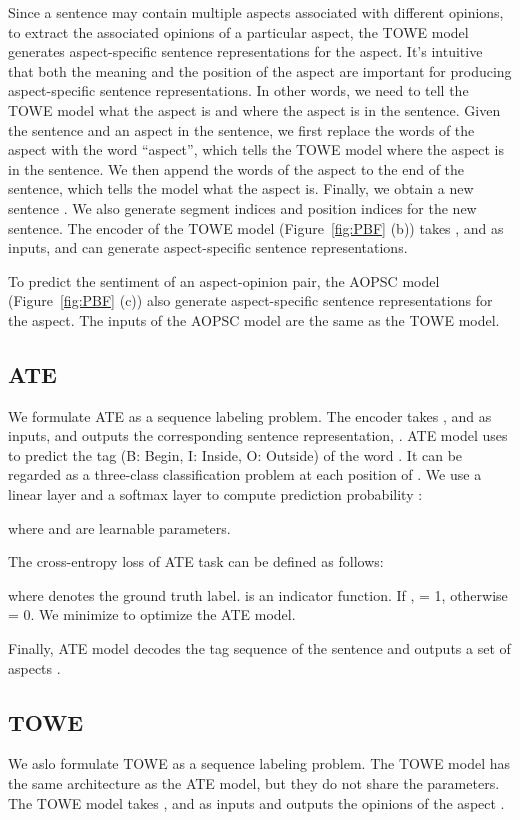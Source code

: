 \documentclass[11pt]{article}
\begin{document}
Since a sentence may contain multiple aspects associated with different opinions, to extract the associated opinions of a particular aspect, the TOWE model generates aspect-specific sentence representations for the aspect. It's intuitive that both the meaning and the position of the aspect are important for producing aspect-specific sentence representations. In other words, we need to tell the TOWE model what the aspect is and where the aspect is in the sentence. Given the sentence  and an aspect  in the sentence, we first replace the words of the aspect with the word ``aspect'', which tells the TOWE model where the aspect is in the sentence. We then append the words of the aspect to the end of the sentence, which tells the model what the aspect is. Finally, we obtain a new sentence . We also generate segment indices  and position indices  for the new sentence. The encoder of the TOWE model (Figure~\ref{fig:PBF} (b)) takes ,  and  as inputs, and can generate aspect-specific sentence representations. 

To predict the sentiment of an aspect-opinion pair, the AOPSC model (Figure~\ref{fig:PBF} (c)) also generate aspect-specific sentence representations for the aspect. The inputs of the AOPSC model are the same as the TOWE model.

\subsection{ATE}
We formulate ATE as a sequence labeling problem. The encoder takes ,  and  as inputs, and outputs the corresponding sentence representation, . ATE model uses  to predict the tag  (B: Begin, I: Inside, O: Outside) of the word . It can be regarded as a three-class classification problem at
each position of . We use a linear layer and a softmax layer to compute prediction probability :

where  and  are learnable parameters.

The cross-entropy loss of ATE task can be defined as follows:

where  denotes the ground truth label.  is an indicator function.  If ,  = 1, otherwise  = 0. We minimize  to optimize the ATE model.

Finally, ATE model decodes the tag sequence of the sentence and outputs a set of aspects .

\subsection{TOWE}
We aslo formulate TOWE as a sequence labeling problem. The TOWE model has the same architecture as the ATE model, but they do not share the parameters. The TOWE model takes ,  and  as inputs and outputs the opinions   of the aspect .
\end{document}
